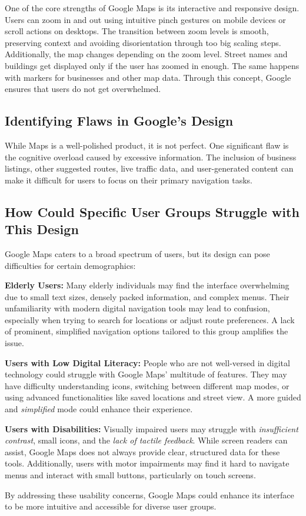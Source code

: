 \blankLine

One of the core strengths of Google Maps is its interactive and responsive design. Users can zoom in and out using intuitive pinch gestures on mobile devices or scroll actions on desktops. The transition between zoom levels is smooth, preserving context and avoiding disorientation through too big scaling steps. Additionally, the map changes depending on the zoom level. Street names and buildings get displayed only if the user has zoomed in enough. The same happens with markers for businesses and other map data. Through this concept, Google ensures that users do not get overwhelmed. \autocite{battersby2008user}

\subsection{Identifying Flaws in Google's Design}

While Maps is a well-polished product, it is not perfect. One significant flaw is the cognitive overload caused by excessive information. The inclusion of business listings, other suggested routes, live traffic data, and user-generated content can make it difficult for users to focus on their primary navigation tasks. \autocite{battersby2008user}

\subsection{How Could Specific User Groups Struggle with This Design}

Google Maps caters to a broad spectrum of users, but its design can pose difficulties for certain demographics:
\blankLine

\textbf{Elderly Users:} Many elderly individuals may find the interface overwhelming due to small text sizes, densely packed information, and complex menus. Their unfamiliarity with modern digital navigation tools may lead to confusion, especially when trying to search for locations or adjust route preferences. A lack of prominent, simplified navigation options tailored to this group amplifies the issue. \autocite{allyant2022google}

\textbf{Users with Low Digital Literacy:} People who are not well-versed in digital technology could struggle with Google Maps' multitude of features. They may have difficulty understanding icons, switching between different map modes, or using advanced functionalities like saved locations and street view. A more guided and \textit{simplified} mode could enhance their experience.

\textbf{Users with Disabilities:} Visually impaired users may struggle with \textit{insufficient contrast}, small icons, and the \textit{lack of tactile feedback}. While screen readers can assist, Google Maps does not always provide clear, structured data for these tools. Additionally, users with motor impairments may find it hard to navigate menus and interact with small buttons, particularly on touch screens. \autocite{froehlich2019grand}

\blankLine

By addressing these usability concerns, Google Maps could enhance its interface to be more intuitive and accessible for diverse user groups.